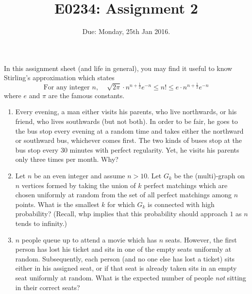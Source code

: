 \documentclass[11pt]{article}
\begin{document}
\title{E0234: Assignment 2}
\author{}
\date{Due: Monday, 25th Jan 2016.}
\maketitle
In this assignment sheet (and life in general), you may find it useful to know Stirling's approximation which states
\[
	\text{For any integer $n$,}~~~~~~ \sqrt{2\pi}\cdot  n^{n+\frac{1}{2}} e^{-n} \leq n! \leq e\cdot n^{n+\frac{1}{2}} e^{-n} 
\]
where $e$ and $\pi$ are the famous constants.
\begin{enumerate}
\item Every evening, a man either visits his parents, who live northwards, or his friend, who lives southwards (but not both). In order to be fair, he goes to the bus stop every evening at a random time and takes either the northward or southward bus, whichever comes first. The two kinds of buses stop at the bus stop every 30 minutes with perfect regularity. Yet, he visits his parents only three times per month. Why?

	
			\item Let $n$ be an even integer and assume $n > 10$. Let $G_k$ be the (multi)-graph on $n$ vertices formed by taking the union of $k$ perfect matchings which are chosen uniformly at random 
	          from the set of all perfect matchings among $n$ points. What is the smallest $k$ for which $G_k$ is connected with high probability? (Recall, whp implies that this probability should approach $1$
	          as $n$ tends to infinity.) 
	          
	 \item $n$ people queue up to attend a movie which has $n$ seats. However, the first person has lost his ticket and sits in one of the empty seats uniformly at random. Subsequently, each person (and no one else has lost a ticket) sits either in his assigned seat, or if that seat is already taken sits in an empty seat uniformly at random. What is the expected number of people {\em not} sitting in their correct seats?
	         

\end{enumerate}
\end{document}
